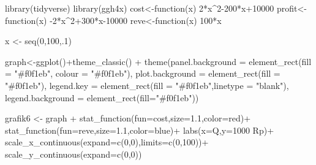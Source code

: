 \documentclass[
  letterpaper,
  DIV=11,
  numbers=noendperiod]{scrartcl}
\newenvironment{Shaded}{\begin{snugshade}}{\end{snugshade}}
\newcommand{\AttributeTok}[1]{\textcolor[rgb]{0.40,0.45,0.13}{#1}}
\newcommand{\ControlFlowTok}[1]{\textcolor[rgb]{0.00,0.23,0.31}{#1}}
\newcommand{\DecValTok}[1]{\textcolor[rgb]{0.68,0.00,0.00}{#1}}
\newcommand{\FloatTok}[1]{\textcolor[rgb]{0.68,0.00,0.00}{#1}}
\newcommand{\FunctionTok}[1]{\textcolor[rgb]{0.28,0.35,0.67}{#1}}
\newcommand{\NormalTok}[1]{\textcolor[rgb]{0.00,0.23,0.31}{#1}}
\newcommand{\OtherTok}[1]{\textcolor[rgb]{0.00,0.23,0.31}{#1}}
\newcommand{\SpecialCharTok}[1]{\textcolor[rgb]{0.37,0.37,0.37}{#1}}
\newcommand{\StringTok}[1]{\textcolor[rgb]{0.13,0.47,0.30}{#1}}
\begin{document}
\begin{Shaded}
\begin{Highlighting}[]
\FunctionTok{library}\NormalTok{(tidyverse)}
\FunctionTok{library}\NormalTok{(ggh4x)}
\NormalTok{cost}\OtherTok{\textless{}{-}}\ControlFlowTok{function}\NormalTok{(x) }\DecValTok{2}\SpecialCharTok{*}\NormalTok{x}\SpecialCharTok{\^{}}\DecValTok{2{-}200}\SpecialCharTok{*}\NormalTok{x}\SpecialCharTok{+}\DecValTok{10000}
\NormalTok{profit}\OtherTok{\textless{}{-}}\ControlFlowTok{function}\NormalTok{(x) }\SpecialCharTok{{-}}\DecValTok{2}\SpecialCharTok{*}\NormalTok{x}\SpecialCharTok{\^{}}\DecValTok{2}\SpecialCharTok{+}\DecValTok{300}\SpecialCharTok{*}\NormalTok{x}\DecValTok{{-}10000}
\NormalTok{reve}\OtherTok{\textless{}{-}}\ControlFlowTok{function}\NormalTok{(x) }\DecValTok{100}\SpecialCharTok{*}\NormalTok{x}

\NormalTok{x }\OtherTok{\textless{}{-}} \FunctionTok{seq}\NormalTok{(}\DecValTok{0}\NormalTok{,}\DecValTok{100}\NormalTok{,.}\DecValTok{1}\NormalTok{)}

\NormalTok{graph}\OtherTok{\textless{}{-}}\FunctionTok{ggplot}\NormalTok{()}\SpecialCharTok{+}\FunctionTok{theme\_classic}\NormalTok{() }\SpecialCharTok{+}
  \FunctionTok{theme}\NormalTok{(}\AttributeTok{panel.background =} \FunctionTok{element\_rect}\NormalTok{(}\AttributeTok{fill =} \StringTok{"\#f0f1eb"}\NormalTok{,}
                                        \AttributeTok{colour =} \StringTok{"\#f0f1eb"}\NormalTok{),}
        \AttributeTok{plot.background =} \FunctionTok{element\_rect}\NormalTok{(}\AttributeTok{fill =} \StringTok{"\#f0f1eb"}\NormalTok{),}
        \AttributeTok{legend.key =} \FunctionTok{element\_rect}\NormalTok{(}\AttributeTok{fill =} \StringTok{"\#f0f1eb"}\NormalTok{,}\AttributeTok{linetype =} \StringTok{"blank"}\NormalTok{),}
        \AttributeTok{legend.background =} \FunctionTok{element\_rect}\NormalTok{(}\AttributeTok{fill=}\StringTok{"\#f0f1eb"}\NormalTok{))}


\NormalTok{grafik6 }\OtherTok{\textless{}{-}}\NormalTok{ graph }\SpecialCharTok{+}
  \FunctionTok{stat\_function}\NormalTok{(}\AttributeTok{fun=}\NormalTok{cost,}\AttributeTok{size=}\FloatTok{1.1}\NormalTok{,}\AttributeTok{color=}\StringTok{\textquotesingle{}red\textquotesingle{}}\NormalTok{)}\SpecialCharTok{+}
  \FunctionTok{stat\_function}\NormalTok{(}\AttributeTok{fun=}\NormalTok{reve,}\AttributeTok{size=}\FloatTok{1.1}\NormalTok{,}\AttributeTok{color=}\StringTok{\textquotesingle{}blue\textquotesingle{}}\NormalTok{)}\SpecialCharTok{+}
  \FunctionTok{labs}\NormalTok{(}\AttributeTok{x=}\StringTok{\textquotesingle{}Q\textquotesingle{}}\NormalTok{,}\AttributeTok{y=}\StringTok{\textquotesingle{}1000 Rp\textquotesingle{}}\NormalTok{)}\SpecialCharTok{+}
  \FunctionTok{scale\_x\_continuous}\NormalTok{(}\AttributeTok{expand=}\FunctionTok{c}\NormalTok{(}\DecValTok{0}\NormalTok{,}\DecValTok{0}\NormalTok{),}\AttributeTok{limits=}\FunctionTok{c}\NormalTok{(}\DecValTok{0}\NormalTok{,}\DecValTok{100}\NormalTok{))}\SpecialCharTok{+}
  \FunctionTok{scale\_y\_continuous}\NormalTok{(}\AttributeTok{expand=}\FunctionTok{c}\NormalTok{(}\DecValTok{0}\NormalTok{,}\DecValTok{0}\NormalTok{))}


\end{Highlighting}
\end{Shaded}
\end{document}
